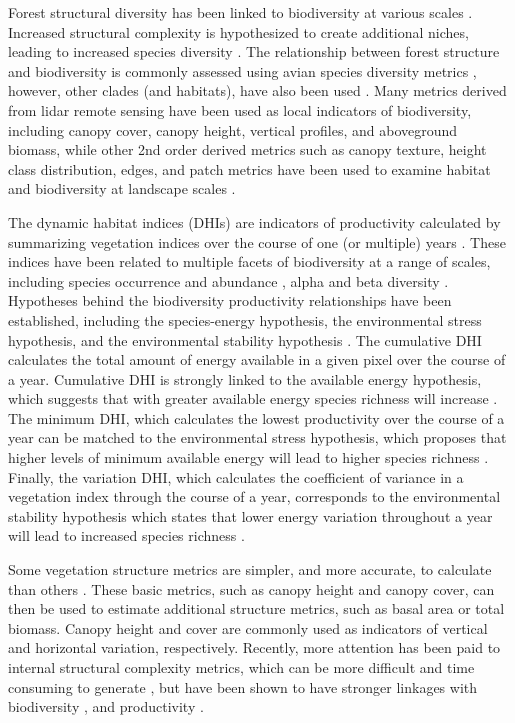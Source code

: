 \documentclass[
  authoryear,
  review,
  3p,
  twocolumn]{elsarticle}
\begin{document}
Forest structural diversity has been linked to biodiversity at various
scales \citep{guo2017, bergen2009, gao2014}. Increased structural
complexity is hypothesized to create additional niches, leading to
increased species diversity \citep{bergen2009}. The relationship between
forest structure and biodiversity is commonly assessed using avian
species diversity metrics \citep{macarthur1961, goetz2007}, however,
other clades (and habitats), have also been used
\citep{davies2014, nelson2005}. Many metrics derived from lidar remote
sensing have been used as local indicators of biodiversity, including
canopy cover, canopy height, vertical profiles, and aboveground biomass,
while other 2nd order derived metrics such as canopy texture, height
class distribution, edges, and patch metrics have been used to examine
habitat and biodiversity at landscape scales \citep{bergen2009}.

The dynamic habitat indices (DHIs) are indicators of productivity
calculated by summarizing vegetation indices over the course of one (or
multiple) years \citep{radeloff2019}. These indices have been related to
multiple facets of biodiversity at a range of scales, including species
occurrence and abundance \citep{razenkova2020}, alpha
\citep{radeloff2019} and beta diversity \citep{andrew2012}. Hypotheses
behind the biodiversity productivity relationships have been
established, including the species-energy hypothesis, the environmental
stress hypothesis, and the environmental stability hypothesis
\citep{coops2019}. The cumulative DHI calculates the total amount of
energy available in a given pixel over the course of a year. Cumulative
DHI is strongly linked to the available energy hypothesis, which
suggests that with greater available energy species richness will
increase \citep{wright1983}. The minimum DHI, which calculates the
lowest productivity over the course of a year can be matched to the
environmental stress hypothesis, which proposes that higher levels of
minimum available energy will lead to higher species richness
\citep{currie2004}. Finally, the variation DHI, which calculates the
coefficient of variance in a vegetation index through the course of a
year, corresponds to the environmental stability hypothesis which states
that lower energy variation throughout a year will lead to increased
species richness \citep{williams2008}.

Some vegetation structure metrics are simpler, and more accurate, to
calculate than others \citep{coops2021}. These basic metrics, such as
canopy height and canopy cover, can then be used to estimate additional
structure metrics, such as basal area or total biomass. Canopy height
and cover are commonly used as indicators of vertical and horizontal
variation, respectively. Recently, more attention has been paid to
internal structural complexity metrics, which can be more difficult and
time consuming to generate \citep{coops2021, ma2022}, but have been
shown to have stronger linkages with biodiversity \citep{guo2017}, and
productivity \citep{ali2019}.
\end{document}
